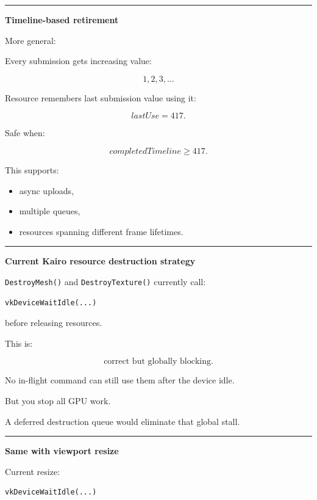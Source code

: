 \begin{center}\rule{0.5\linewidth}{0.5pt}\end{center}

\textbf{Timeline-based retirement}

More general:

Every submission gets increasing value:

\[
1,2,3,\dots
\]

Resource remembers last submission value using it:

\[
lastUse=417.
\]

Safe when:

\[
completedTimeline\ge417.
\]

This supports:

\begin{itemize}
\tightlist
\item
  async uploads,
\item
  multiple queues,
\item
  resources spanning different frame lifetimes.
\end{itemize}

\begin{center}\rule{0.5\linewidth}{0.5pt}\end{center}

\textbf{Current Kairo resource destruction strategy}

\texttt{DestroyMesh()} and \texttt{DestroyTexture()} currently call:

\begin{verbatim}
vkDeviceWaitIdle(...)
\end{verbatim}

before releasing resources.

This is:

\[
\boxed{\text{correct but globally blocking}.}
\]

No in-flight command can still use them after the device idle.

But you stop all GPU work.

A deferred destruction queue would eliminate that global stall.

\begin{center}\rule{0.5\linewidth}{0.5pt}\end{center}

\textbf{Same with viewport resize}

Current resize:

\begin{verbatim}
vkDeviceWaitIdle(...)
\end{verbatim}

